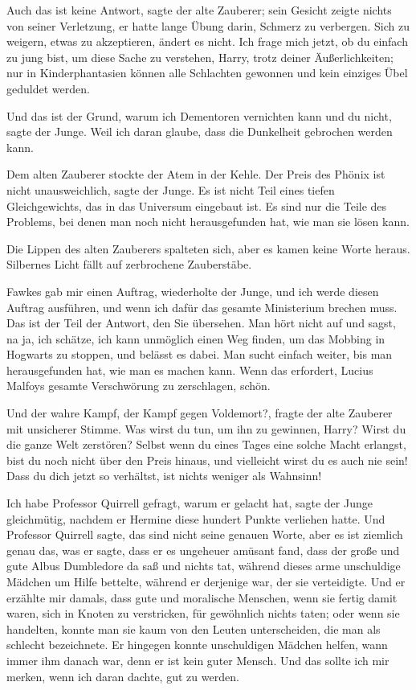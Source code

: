 \glqq{}Auch das ist keine Antwort\grqq{}, sagte der alte Zauberer; sein Gesicht
zeigte nichts von seiner Verletzung, er hatte lange Übung darin, Schmerz zu
verbergen. \glqq{}Sich zu weigern, etwas zu akzeptieren, ändert es nicht. Ich
frage mich jetzt, ob du einfach zu jung bist, um diese Sache zu verstehen,
Harry, trotz deiner Äußerlichkeiten; nur in Kinderphantasien können alle
Schlachten gewonnen und kein einziges Übel geduldet werden.\grqq{}

\glqq{}Und das ist der Grund, warum ich Dementoren vernichten kann und du
nicht\grqq{}, sagte der Junge. \glqq{}Weil ich daran glaube, dass die Dunkelheit
gebrochen werden kann.\grqq{}

Dem alten Zauberer stockte der Atem in der Kehle. \glqq{}Der Preis des Phönix ist
nicht unausweichlich\grqq{}, sagte der Junge. \glqq{}Es ist nicht Teil eines
tiefen Gleichgewichts, das in das Universum eingebaut ist. Es sind nur die Teile
des Problems, bei denen man noch nicht herausgefunden hat, wie man sie lösen
kann.\grqq{}

Die Lippen des alten Zauberers spalteten sich, aber es kamen keine Worte heraus.
Silbernes Licht fällt auf zerbrochene Zauberstäbe.

\glqq{}Fawkes gab mir einen Auftrag\grqq{}, wiederholte der Junge, \glqq{}und ich
werde diesen Auftrag ausführen, und wenn ich dafür das gesamte Ministerium
brechen muss. Das ist der Teil der Antwort, den Sie übersehen. Man hört nicht
auf und sagst, na ja, ich schätze, ich kann unmöglich einen Weg finden, um das
Mobbing in Hogwarts zu stoppen, und belässt es dabei. Man sucht einfach weiter,
bis man herausgefunden hat, wie man es machen kann. Wenn das erfordert, Lucius
Malfoys gesamte Verschwörung zu zerschlagen, schön.\grqq{}

\glqq{}Und der wahre Kampf, der Kampf gegen Voldemort?\grqq{}, fragte der alte
Zauberer mit unsicherer Stimme. \glqq{}Was wirst du tun, um ihn zu gewinnen,
Harry? Wirst du die ganze Welt zerstören? Selbst wenn du eines Tages eine solche
Macht erlangst, bist du noch nicht über den Preis hinaus, und vielleicht wirst
du es auch nie sein! Dass du dich jetzt so verhältst, ist nichts weniger als
Wahnsinn!\grqq{}

\glqq{}Ich habe Professor Quirrell gefragt, warum er gelacht hat\grqq{}, sagte
der Junge gleichmütig, \glqq{}nachdem er Hermine diese hundert Punkte verliehen
hatte. Und Professor Quirrell sagte, das sind nicht seine genauen Worte, aber es
ist ziemlich genau das, was er sagte, dass er es ungeheuer amüsant fand, dass
der große und gute Albus Dumbledore da saß und nichts tat, während dieses arme
unschuldige Mädchen um Hilfe bettelte, während er derjenige war, der sie
verteidigte. Und er erzählte mir damals, dass gute und moralische Menschen, wenn
sie fertig damit waren, sich in Knoten zu verstricken, für gewöhnlich nichts
taten; oder wenn sie handelten, konnte man sie kaum von den Leuten
unterscheiden, die man als schlecht bezeichnete. Er hingegen konnte unschuldigen
Mädchen helfen, wann immer ihm danach war, denn er ist kein guter Mensch. Und
das sollte ich mir merken, wenn ich daran dachte, gut zu werden.\grqq{}


